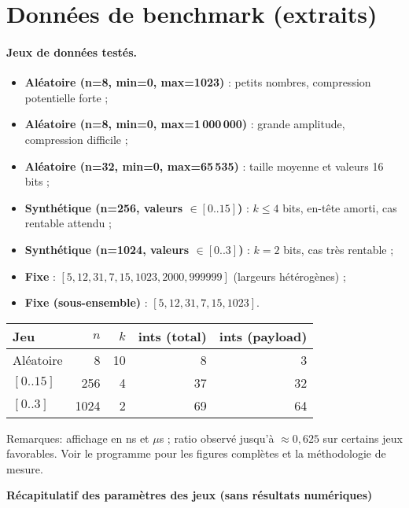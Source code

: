 \section{Données de benchmark (extraits)}
\label{sec:data}

\paragraph{Jeux de données testés.}
\begin{itemize}
	\item \textbf{Aléatoire (n=8, min=0, max=1023)} : petits nombres, compression potentielle forte ;
	\item \textbf{Aléatoire (n=8, min=0, max=1\,000\,000)} : grande amplitude, compression difficile ;
	\item \textbf{Aléatoire (n=32, min=0, max=65\,535)} : taille moyenne et valeurs 16 bits ;
	\item \textbf{Synthétique (n=256, valeurs $\in [0..15]$)} : $k\le 4$ bits, en-tête amorti, cas rentable attendu ;
	\item \textbf{Synthétique (n=1024, valeurs $\in [0..3]$)} : $k=2$ bits, cas très rentable ;
	\item \textbf{Fixe} : $[5, 12, 31, 7, 15, 1023, 2000, 999999]$ (largeurs hétérogènes) ;
	\item \textbf{Fixe (sous-ensemble)} : $[5, 12, 31, 7, 15, 1023]$.
\end{itemize}

\begin{tabularx}{\textwidth}{lrrrr}
\toprule
Jeu & $n$ & $k$ & ints (total) & ints (payload)\\
\midrule
Aléatoire & 8 & 10 & 8 & 3\\
$[0..15]$ & 256 & 4 & 37 & 32\\
$[0..3]$ & 1024 & 2 & 69 & 64\\
\bottomrule
\end{tabularx}

\vspace{6pt}
\noindent Remarques: affichage en ns et $\mu$s ; ratio observé jusqu'à $\approx 0{,}625$ sur certains jeux favorables. Voir le programme pour les figures complètes et la méthodologie de mesure.

\vspace{6pt}
\noindent\textbf{Récapitulatif des paramètres des jeux (sans résultats numériques)}

